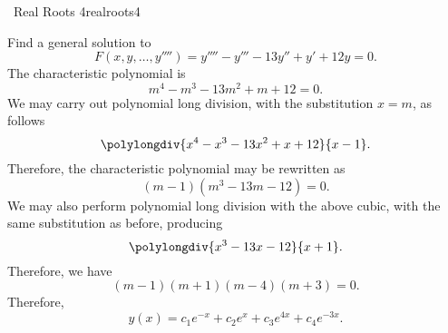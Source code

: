         \begin{example}{\Difficulty\,\Difficulty\,\,Real Roots 4}{realroots4}
        
            Find a general solution to
            \begin{equation*}
                F(x,y,\ldots,y'''')=y''''-y'''-13y''+y'+12y=0.
            \end{equation*}
            The characteristic polynomial is
            \begin{equation*}
                m^4-m^3-13m^2+m+12=0.
            \end{equation*}
            We may carry out polynomial long division, with the substitution \(x=m\), as follows
            \begin{equation*}
                \polylongdiv{x^4-x^3-13x^2+x+12}{x-1}.
            \end{equation*}
            Therefore, the characteristic polynomial may be rewritten as
            \begin{equation*}
                (m-1)(m^3-13m-12)=0.
            \end{equation*}
            We may also perform polynomial long division with the above cubic, with the same substitution as before, producing
            \begin{equation*}
                \polylongdiv{x^3-13x-12}{x+1}.
            \end{equation*}
            Therefore, we have
            \begin{equation*}
                (m-1)(m+1)(m-4)(m+3)=0.
            \end{equation*}
            Therefore,
            \begin{equation*}
                y(x)=c_1e^{-x}+c_2e^{x}+c_3e^{4x}+c_4e^{-3x}.
            \end{equation*}
            
        \end{example}
        \pagebreak
